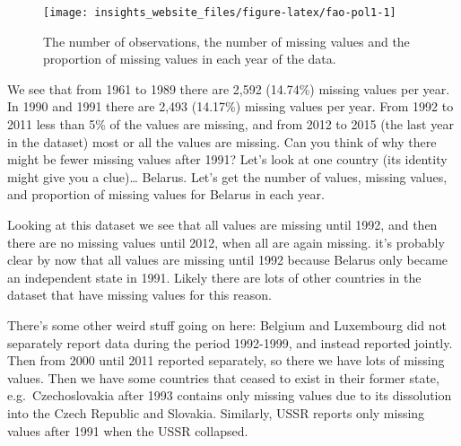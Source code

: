 \documentclass[]{book}
\newenvironment{Shaded}{\begin{snugshade}}{\end{snugshade}}
\newcommand{\DataTypeTok}[1]{\textcolor[rgb]{0.13,0.29,0.53}{#1}}
\newcommand{\KeywordTok}[1]{\textcolor[rgb]{0.13,0.29,0.53}{\textbf{#1}}}
\newcommand{\NormalTok}[1]{#1}
\newcommand{\OperatorTok}[1]{\textcolor[rgb]{0.81,0.36,0.00}{\textbf{#1}}}
\newcommand{\StringTok}[1]{\textcolor[rgb]{0.31,0.60,0.02}{#1}}
\begin{document}
\begin{figure}

{\centering \texttt{[image: insights\_website\_files/figure-latex/fao-pol1-1]} 

}

\caption{The number of observations, the number of missing values and the proportion of missing values in each year of the data.}\label{fig:fao-pol1}
\end{figure}

We see that from 1961 to 1989 there are 2,592 (14.74\%) missing values per year. In 1990 and 1991 there are 2,493 (14.17\%) missing values per year. From 1992 to 2011 less than 5\% of the values are missing, and from 2012 to 2015 (the last year in the dataset) most or all the values are missing. Can you think of why there might be fewer missing values after 1991? Let's look at one country (its identity might give you a clue)\ldots{} Belarus. Let's get the number of values, missing values, and proportion of missing values for Belarus in each year.

\begin{Shaded}
\end{Shaded}

Looking at this dataset we see that all values are missing until 1992, and then there are no missing values until 2012, when all are again missing. it's probably clear by now that all values are missing until 1992 because Belarus only became an independent state in 1991. Likely there are lots of other countries in the dataset that have missing values for this reason.

There's some other weird stuff going on here: Belgium and Luxembourg did not separately report data during the period 1992-1999, and instead reported jointly. Then from 2000 until 2011 reported separately, so there we have lots of missing values. Then we have some countries that ceased to exist in their former state, e.g.~Czechoslovakia after 1993 contains only missing values due to its dissolution into the Czech Republic and Slovakia. Similarly, USSR reports only missing values after 1991 when the USSR collapsed.
\end{document}
